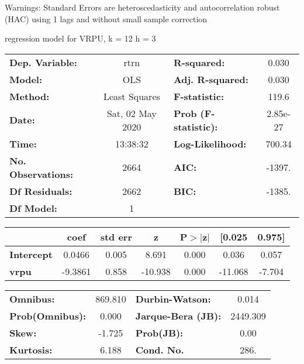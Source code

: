 Warnings: \newline
 [1] Standard Errors are heteroscedasticity and autocorrelation robust (HAC) using 1 lags and without small sample correction\ 

regression model for VRPU, k = 12 h = 3\begin{center}
\begin{tabular}{lclc}
\toprule
\textbf{Dep. Variable:}    &       rtrn       & \textbf{  R-squared:         } &     0.030   \\
\textbf{Model:}            &       OLS        & \textbf{  Adj. R-squared:    } &     0.030   \\
\textbf{Method:}           &  Least Squares   & \textbf{  F-statistic:       } &     119.6   \\
\textbf{Date:}             & Sat, 02 May 2020 & \textbf{  Prob (F-statistic):} &  2.85e-27   \\
\textbf{Time:}             &     13:38:32     & \textbf{  Log-Likelihood:    } &    700.34   \\
\textbf{No. Observations:} &        2664      & \textbf{  AIC:               } &    -1397.   \\
\textbf{Df Residuals:}     &        2662      & \textbf{  BIC:               } &    -1385.   \\
\textbf{Df Model:}         &           1      & \textbf{                     } &             \\
\bottomrule
\end{tabular}
\begin{tabular}{lcccccc}
                   & \textbf{coef} & \textbf{std err} & \textbf{z} & \textbf{P$> |$z$|$} & \textbf{[0.025} & \textbf{0.975]}  \\
\midrule
\textbf{Intercept} &       0.0466  &        0.005     &     8.691  &         0.000        &        0.036    &        0.057     \\
\textbf{vrpu}      &      -9.3861  &        0.858     &   -10.938  &         0.000        &      -11.068    &       -7.704     \\
\bottomrule
\end{tabular}
\begin{tabular}{lclc}
\textbf{Omnibus:}       & 869.810 & \textbf{  Durbin-Watson:     } &    0.014  \\
\textbf{Prob(Omnibus):} &   0.000 & \textbf{  Jarque-Bera (JB):  } & 2449.309  \\
\textbf{Skew:}          &  -1.725 & \textbf{  Prob(JB):          } &     0.00  \\
\textbf{Kurtosis:}      &   6.188 & \textbf{  Cond. No.          } &     286.  \\
\bottomrule
\end{tabular}
\end{center}

